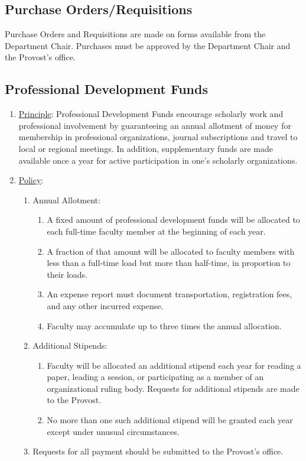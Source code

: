 	\subsection{Purchase Orders/Requisitions}
		Purchase Orders and Requisitions are made on forms available from the Department Chair.  Purchases must be approved by the Department Chair and the Provost's office.
	\subsection{Professional Development Funds}
		\begin{enumerate}[label=\alph*)]
			\item{\underline{Principle}:  Professional Development Funds encourage scholarly work and professional involvement by guaranteeing an annual allotment of money for membership in professional organizations, journal subscriptions and travel to local or regional meetings.  In addition, supplementary funds are made available once a year for active participation in one's scholarly organizations.
			}
			\item{\underline{Policy}:
				\begin{enumerate}[label=\arabic*)]
					\item{Annual Allotment:
						\begin{enumerate}[label=(\alph*)]
							\item{A fixed amount of professional development funds will be allocated to each full-time faculty member at the beginning of each year.
							}
							\item{A fraction of that amount will be allocated to faculty members with less than a full-time load but more than half-time, in proportion to their loads.
							}
							\item{An expense report must document transportation, registration fees, and any other incurred expense.
							}
							\item{Faculty may accumulate up to three times the annual allocation.
							}
						\end{enumerate}
					}
					\item{Additional Stipends:
						\begin{enumerate}[label=(\alph*)]
							\item{Faculty will be allocated an additional stipend each year for reading a paper, leading a session, or participating as a member of an organizational ruling body.  Requests for additional stipends are made to the Provost.
							}
							\item{No more than one such additional stipend will be granted each year except under unusual circumstances.
							}
						\end{enumerate}
					}
					\item{Requests for all payment should be submitted to the Provost's office.
					}
				\end{enumerate}
			}
		\end{enumerate}
